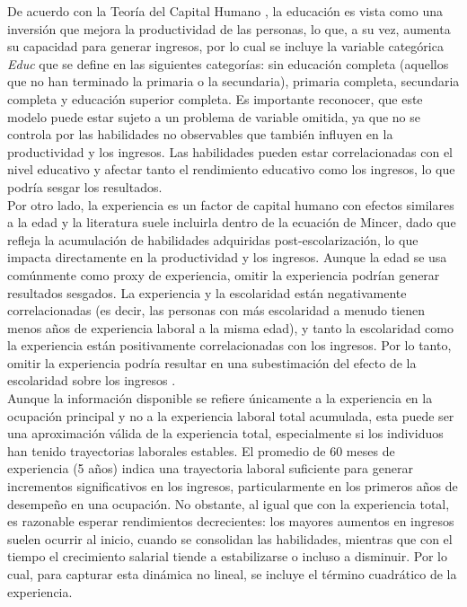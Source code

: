 \documentclass[12pt,a4paper,onecolumn]{article}
\begin{document}
De acuerdo con la Teoría del Capital Humano \citep{becker1964}, la educación es vista como una inversión que mejora la productividad de las personas, lo que, a su vez, aumenta su capacidad para generar ingresos, por lo cual se incluye la variable categórica \textit{Educ} que se define en las siguientes categorías: sin educación completa (aquellos que no han terminado la primaria o la secundaria), primaria completa, secundaria completa y educación superior completa. Es importante reconocer, que este modelo puede estar sujeto a un problema de variable omitida, ya que no se controla por las habilidades no observables que también influyen en la productividad y los ingresos. Las habilidades pueden estar correlacionadas con el nivel educativo y afectar tanto el rendimiento educativo como los ingresos, lo que podría sesgar los resultados. \\

Por otro lado, la experiencia es un factor de capital humano con efectos similares a la edad y la literatura suele incluirla dentro de la ecuación de Mincer,  dado que refleja la acumulación de habilidades adquiridas post-escolarización, lo que impacta directamente en la productividad y los ingresos.  Aunque la edad se usa comúnmente como proxy de experiencia, omitir la experiencia podrían generar resultados sesgados. La experiencia y la escolaridad están negativamente correlacionadas (es decir, las personas con más escolaridad a menudo tienen menos años de experiencia laboral a la misma edad), y tanto la escolaridad como la experiencia están positivamente correlacionadas con los ingresos. Por lo tanto, omitir la experiencia podría resultar en una subestimación del efecto de la escolaridad sobre los ingresos \citep{patrinos2016}.  \\

Aunque la información disponible se refiere únicamente a la experiencia en la ocupación principal y no a la experiencia laboral total acumulada, esta puede ser una aproximación válida de la experiencia total, especialmente si los individuos han tenido trayectorias laborales estables. El promedio de 60 meses de experiencia (5 años) indica una trayectoria laboral suficiente para generar incrementos significativos en los ingresos, particularmente en los primeros años de desempeño en una ocupación. No obstante, al igual que con la experiencia total, es razonable esperar rendimientos decrecientes: los mayores aumentos en ingresos suelen ocurrir al inicio, cuando se consolidan las habilidades, mientras que con el tiempo el crecimiento salarial tiende a estabilizarse o incluso a disminuir. Por lo cual, para capturar esta dinámica no lineal, se incluye el término cuadrático de la experiencia. \\
\end{document}
